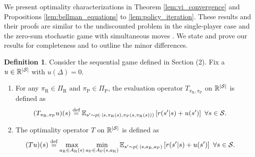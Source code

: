 \documentclass[aoas]{imsart}
\theoremstyle{plain}
\theoremstyle{definition}
\newtheorem{definition}[theorem]{Definition}
\newcommand{\defeq}{\stackrel{\text{def}}{=}}
\newcommand{\abs}[1]{\left\lvert#1\right\rvert}
\begin{document}
        We present optimality characterizations in Theorem \ref{lem:vi_convergence} and Propositions \ref{lem:bellman_equations} to  \ref{lem:policy_iteration}. These results and their proofs are similar to the undiscounted problem in the single-player case \cite[Section 7.2]{bertsekas_dynamic_2012} and the zero-sum stochastic game with simultaneous moves \cite{patek_stochastic_1999}. We state and prove our results for completeness and to outline the minor differences. 
      \begin{definition}\label{defn:sg_operators}
        \normalfont
        Consider the sequential game defined in Section (2). Fix a $u \in \mathbb{R}^{\abs{\cal S}}$ with $u(\Delta) = 0$.
        \begin{enumerate}
            \item For any $\pi_\text{R} \in \Pi_\text{R}$ and $\pi_\text{P} \in \Pi_\text{P}$, the evaluation operator $T_{\pi_\text{R},\pi_{\text{P}}}$ on $\mathbb{R}^{\abs{\cal S}}$ is defined as
            \begingroup
            \allowdisplaybreaks
            \begin{align}
            \label{eqn:eval_operator}
            (T_{\pi_\text{R},\pi_{\text{P}}} u)(s) &\defeq \mathbb{E}_{s' \sim p(\cdot|s,\pi_\text{R}(s),\pi_\text{P}(s,\pi_\text{R}(s)))}\left[r(s'|s) + u(s')\right] \ \forall s \in {\cal S}.
            \end{align}
            \endgroup
            \item The optimality operator $T$ on $\mathbb{R}^{\abs{\cal S}}$ is defined as
            \begingroup
            \allowdisplaybreaks
            \begin{align}
            \label{eqn:bellman_operator}
            (T u)(s) &\defeq \max_{a_\text{R} \in A_\text{R}(s)}\min_{a_\text{P} \in A_\text{P}(s,a_\text{R})}\mathbb{E}_{s' \sim p(\cdot|s,a_\text{R},a_\text{P})}\left[r(s'|s) + u(s')\right] \ \forall s \in {\cal S}.
            \end{align}
            \endgroup
        \end{enumerate}       
       \end{definition}
\end{document}
